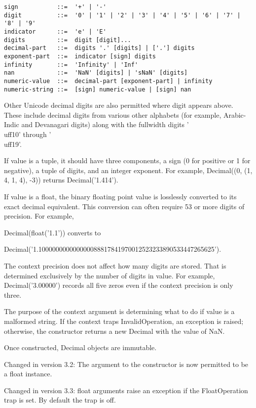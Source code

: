 \begin{lstlisting}
sign           ::=  '+' | '-'
digit          ::=  '0' | '1' | '2' | '3' | '4' | '5' | '6' | '7' | '8' | '9'
indicator      ::=  'e' | 'E'
digits         ::=  digit [digit]...
decimal-part   ::=  digits '.' [digits] | ['.'] digits
exponent-part  ::=  indicator [sign] digits
infinity       ::=  'Infinity' | 'Inf'
nan            ::=  'NaN' [digits] | 'sNaN' [digits]
numeric-value  ::=  decimal-part [exponent-part] | infinity
numeric-string ::=  [sign] numeric-value | [sign] nan
\end{lstlisting}

Other Unicode decimal digits are also permitted where digit appears above. These include decimal digits from various other alphabets (for example, Arabic-Indic and Devanagari digits) along with the fullwidth digits '\\uff10' through '\\uff19'.

\vpara
If value is a tuple, it should have three components, a sign (0 for positive or 1 for negative), a tuple of digits, and an integer exponent. For example, Decimal((0, (1, 4, 1, 4), -3)) returns Decimal('1.414').

\vpara
If value is a float, the binary floating point value is losslessly converted to its exact decimal equivalent. This conversion can often require 53 or more digits of precision. For example,

Decimal(float('1.1')) converts to 

Decimal('1.100000000000000088817841970012523233890533447265625').

\vpara
The context precision does not affect how many digits are stored. That is determined exclusively by the number of digits in value. For example, Decimal('3.00000') records all five zeros even if the context precision is only three.

\vpara
The purpose of the context argument is determining what to do if value is a malformed string. If the context traps InvalidOperation, an exception is raised; otherwise, the constructor returns a new Decimal with the value of NaN.

\vpara
Once constructed, Decimal objects are immutable.

Changed in version 3.2: The argument to the constructor is now permitted to be a float instance.

Changed in version 3.3: float arguments raise an exception if the FloatOperation trap is set. By default the trap is off.


